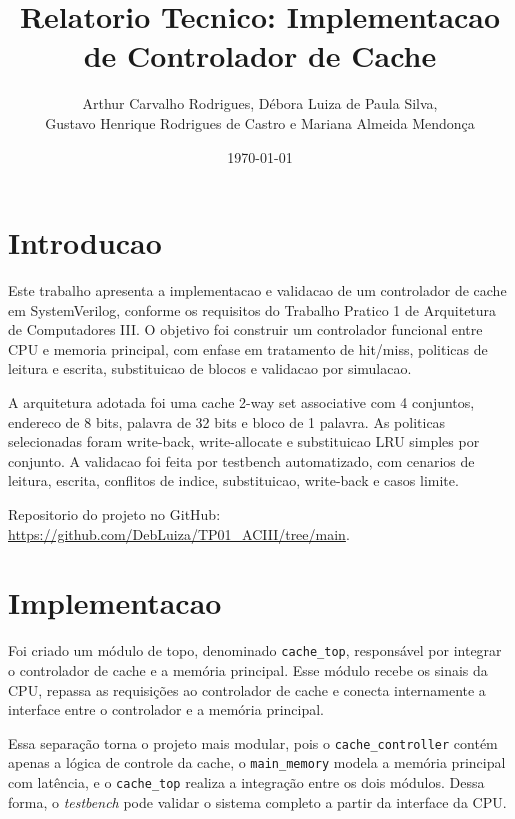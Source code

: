 ﻿\documentclass[12pt,a4paper]{article}
\title{Relatorio Tecnico: Implementacao de Controlador de Cache}
\author{Arthur Carvalho Rodrigues, Débora Luiza de Paula Silva, \\ Gustavo Henrique Rodrigues de Castro e Mariana Almeida Mendonça}
\date{\today}
\begin{document}
\maketitle

\section{Introducao}
Este trabalho apresenta a implementacao e validacao de um controlador de cache em SystemVerilog, conforme os requisitos do Trabalho Pratico 1 de Arquitetura de Computadores III. O objetivo foi construir um controlador funcional entre CPU e memoria principal, com enfase em tratamento de hit/miss, politicas de leitura e escrita, substituicao de blocos e validacao por simulacao.

A arquitetura adotada foi uma cache 2-way set associative com 4 conjuntos, endereco de 8 bits, palavra de 32 bits e bloco de 1 palavra. As politicas selecionadas foram write-back, write-allocate e substituicao LRU simples por conjunto. A validacao foi feita por testbench automatizado, com cenarios de leitura, escrita, conflitos de indice, substituicao, write-back e casos limite.

Repositorio do projeto no GitHub: \href{https://github.com/DebLuiza/TP01_ACIII/tree/main}{https://github.com/DebLuiza/TP01_ACIII/tree/main}.

\section{Implementacao}
Foi criado um módulo de topo, denominado \texttt{cache\_top}, responsável por integrar o controlador de cache e a memória principal. Esse módulo recebe os sinais da CPU, repassa as requisições ao controlador de cache e conecta internamente a interface entre o controlador e a memória principal.

Essa separação torna o projeto mais modular, pois o \texttt{cache\_controller} contém apenas a lógica de controle da cache, o \texttt{main\_memory} modela a memória principal com latência, e o \texttt{cache\_top} realiza a integração entre os dois módulos. Dessa forma, o \textit{testbench} pode validar o sistema completo a partir da interface da CPU.
\end{document}
